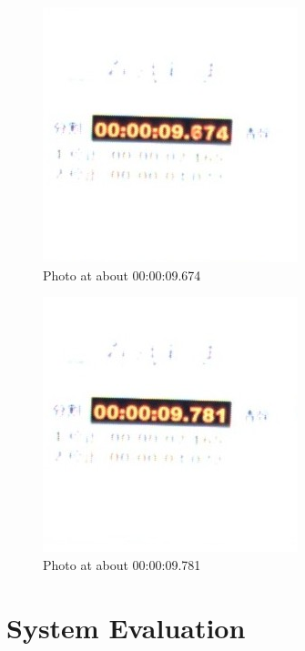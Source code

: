 \documentclass[conference]{IEEEtran}
\begin{document}
	
	\begin{figure}
		\centering
		\includegraphics[width=.4\textwidth]{600ms.jpeg}
		\caption{Photo at about 00:00:09.674}
		\label{600ms}
	\end{figure}
	
	\begin{figure}
		\centering
		\includegraphics[width=.4\textwidth]{700ms.jpeg}
		\caption{Photo at about 00:00:09.781}
		\label{700ms}
	\end{figure}
	
	
	\section{System Evaluation}
\end{document}
